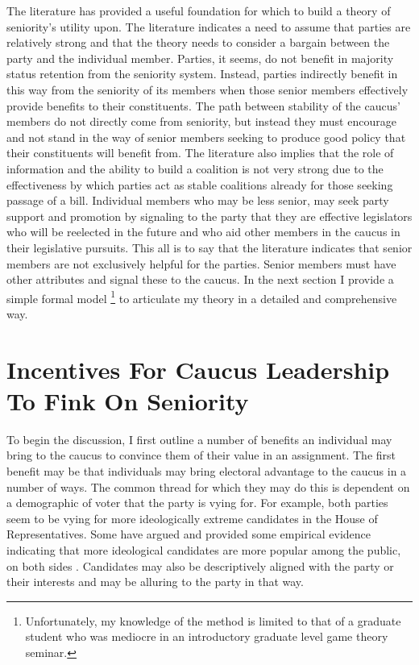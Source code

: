\documentclass [12pt]{article}
\begin{document}
The literature has provided a useful foundation for which to build a theory of seniority's utility upon. The literature indicates a need to assume that parties are relatively strong and that the theory needs to consider a bargain between the party and the individual member. Parties, it seems, do not benefit in majority status retention from the seniority system. Instead, parties indirectly benefit in this way from the seniority of its members when those senior members effectively provide benefits to their constituents. The path between stability of the caucus' members do not directly come from seniority, but instead they must encourage and not stand in the way of senior members seeking to produce good policy that their constituents will benefit from. The literature also implies that the role of information and the ability to build a coalition is not very strong due to the effectiveness by which parties act as stable coalitions already for those seeking passage of a bill. Individual members who may be less senior, may seek party support and promotion by signaling to the party that they are effective legislators who will be reelected in the future and who aid other members in the caucus in their legislative pursuits. This all is to say that the literature indicates that senior members are not exclusively helpful for the parties. Senior members must have other attributes and signal these to the caucus. In the next section I provide a simple formal model \footnote{Unfortunately, my knowledge of the method is limited to that of a graduate student who was mediocre in an introductory graduate level game theory seminar.} to articulate my theory in a detailed and comprehensive way. 


\section*{Incentives For Caucus Leadership To Fink On Seniority}

To begin the discussion, I first outline a number of benefits an individual may bring to the caucus to convince them of their value in an assignment. The first benefit may be that individuals may bring electoral advantage to the caucus in a number of ways. The common thread for which they may do this is dependent on a demographic of voter that the party is vying for. For example, both parties seem to be vying for more ideologically extreme candidates in the House of Representatives. Some have argued and provided some empirical evidence indicating that more ideological candidates are more popular among the public, on both sides \cite{Utych2019}. Candidates may also be descriptively aligned with the party or their interests and may be alluring to the party in that way. 
\end{document}
